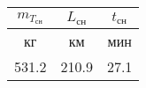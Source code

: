 \begin{tabular}{|c|c|c|}
\hline
$m_{T_{сн}}$ & $L_{сн}$ & $t_{сн}$ \\ 
\hline
кг & км & мин \\ 
\hline
531.2 & 210.9 & 27.1 \\ 
\hline
\end{tabular}